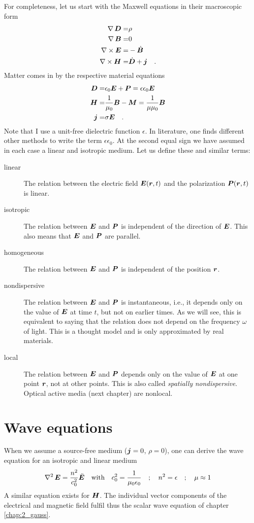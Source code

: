 For completeness, let us start with the Maxwell equations in their macroscopic form
\begin{align}
\nabla \, \boldsymbol{D} = & \rho \\
\nabla \, \boldsymbol{B} = & 0 \\
\nabla \times \boldsymbol{E} =  & - \dot{\boldsymbol{B}} \\
\nabla \times \boldsymbol{H} = & \dot{\boldsymbol{D}} + \boldsymbol{j} \quad .
\end{align} 
Matter comes in by the respective material equations
\begin{align}
    \boldsymbol{D} = & \epsilon_0 \boldsymbol{E} +  \boldsymbol{P} = \epsilon \epsilon_0 \boldsymbol{E} \\
    \boldsymbol{H} = & \frac{1}{\mu_0} \boldsymbol{B} - \boldsymbol{M} =   \frac{1}{\mu \mu_0} \boldsymbol{B} \\
    \boldsymbol{j} = & \sigma \boldsymbol{E} \quad .
\end{align}
Note that I use a unit-free dielectric function $\epsilon$. In literature, one finds different other methods to write the term $\epsilon \epsilon_0$. At the second equal sign we have assumed in each case a linear and isotropic medium. Let us define these and similar terms:
%
\begin{description}
    \item[linear] The relation between the electric field $\boldsymbol{E}(\boldsymbol{r}, t)$ and the polarization $\boldsymbol{P}(\boldsymbol{r}, t)$ is linear.
    \item[isotropic] The relation between $\boldsymbol{E}$ and $\boldsymbol{P}$ is independent of the direction of $\boldsymbol{E}$. This also means that $\boldsymbol{E}$ and $\boldsymbol{P}$ are parallel.
    \item[homogeneous] The relation between $\boldsymbol{E}$ and $\boldsymbol{P}$ is independent of the position $\boldsymbol{r}$.
    \item[nondispersive] The relation between $\boldsymbol{E}$ and $\boldsymbol{P}$ is instantaneous, i.e., it depends only on the value of $\boldsymbol{E}$ at time $t$, but not on earlier times. As we will see, this is equivalent to saying that the relation does not depend on the frequency $\omega$ of light. This is a thought model and is only approximated by real materials.
    \item[local] The relation between $\boldsymbol{E}$ and $\boldsymbol{P}$ depends only on the value of $\boldsymbol{E}$ at one point $\boldsymbol{r}$, not at other points. This is also called \emph{spatially nondispersive}. Optical active media (next chapter) are nonlocal.
\end{description}


\section{Wave equations}
When we assume a source-free medium ($\boldsymbol{j} = 0$, $\rho = 0$), one can derive the wave equation for an isotropic  and linear medium
\begin{equation}
    \nabla^2 \, \boldsymbol{E} = \frac{n^2}{c_0^2} \ddot{\boldsymbol{E}} \quad \text{with} \quad c_0^2 = \frac{1}{\mu_0 \epsilon_0} \quad ; \quad   n^2 = \epsilon \quad; \quad  \mu \approx 1 
\end{equation}
A similar equation exists for $\boldsymbol{H}$. The individual vector components of the electrical and magnetic field fulfil thus the scalar wave equation of chapter \ref{chap:2_gauss}.

